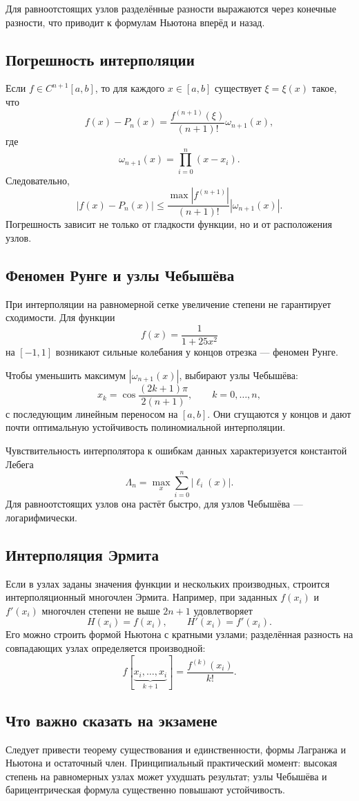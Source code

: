 Для равноотстоящих узлов разделённые разности выражаются через конечные разности,
что приводит к формулам Ньютона вперёд и назад.

\subsection{Погрешность интерполяции}

Если $f\in C^{n+1}[a,b]$, то для каждого $x\in[a,b]$ существует
$\xi=\xi(x)$ такое, что
\[
    f(x)-P_n(x)=
    \frac{f^{(n+1)}(\xi)}{(n+1)!}
    \omega_{n+1}(x),
\]
где
\[
    \omega_{n+1}(x)=\prod_{i=0}^{n}(x-x_i).
\]
Следовательно,
\[
    |f(x)-P_n(x)|
    \leq
    \frac{\max|f^{(n+1)}|}{(n+1)!}
    |\omega_{n+1}(x)|.
\]
Погрешность зависит не только от гладкости функции, но и от расположения узлов.

\subsection{Феномен Рунге и узлы Чебышёва}

При интерполяции на равномерной сетке увеличение степени не гарантирует
сходимости. Для функции
\[
    f(x)=\frac{1}{1+25x^2}
\]
на $[-1,1]$ возникают сильные колебания у концов отрезка --- феномен Рунге.

Чтобы уменьшить максимум $|\omega_{n+1}(x)|$, выбирают узлы Чебышёва:
\[
    x_k=\cos\frac{(2k+1)\pi}{2(n+1)},
    \qquad k=0,\ldots,n,
\]
с последующим линейным переносом на $[a,b]$. Они сгущаются у концов и дают почти
оптимальную устойчивость полиномиальной интерполяции.

Чувствительность интерполятора к ошибкам данных характеризуется константой
Лебега
\[
    \Lambda_n=\max_x\sum_{i=0}^{n}|\ell_i(x)|.
\]
Для равноотстоящих узлов она растёт быстро, для узлов Чебышёва --- логарифмически.

\subsection{Интерполяция Эрмита}

Если в узлах заданы значения функции и нескольких производных, строится
интерполяционный многочлен Эрмита. Например, при заданных $f(x_i)$ и $f'(x_i)$
многочлен степени не выше $2n+1$ удовлетворяет
\[
    H(x_i)=f(x_i),
    \qquad
    H'(x_i)=f'(x_i).
\]
Его можно строить формой Ньютона с кратными узлами; разделённая разность на
совпадающих узлах определяется производной:
\[
    f[\underbrace{x_i,\ldots,x_i}_{k+1}]
    =\frac{f^{(k)}(x_i)}{k!}.
\]

\subsection{Что важно сказать на экзамене}

Следует привести теорему существования и единственности, формы Лагранжа и
Ньютона и остаточный член. Принципиальный практический момент: высокая степень на
равномерных узлах может ухудшать результат; узлы Чебышёва и барицентрическая
формула существенно повышают устойчивость.

\newpage